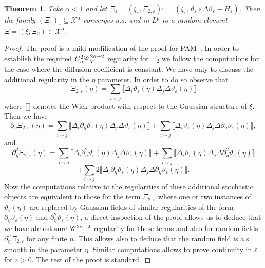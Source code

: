 \documentclass[11pt,reqno]{amsart}
\newtheorem{theorem}{Theorem}
\newcommand{\CC}{\mathscr{C} \hspace{.1em}}
\begin{document}
\begin{theorem}
  \label{th:conv-white-noise}Take $\alpha < 1$ and let $\Xi_{\varepsilon} =
  (\xi_{\varepsilon}, \Xi_{2, \varepsilon}) : = (\xi_{\varepsilon},
  \vartheta_{\varepsilon} \circ \Delta \vartheta_{\varepsilon} -
  H_{\varepsilon})$. Then the family $(\Xi_{\varepsilon})_{\varepsilon}
  \subseteq \mathcal{X}^{\alpha}$ converges a.s. and in $L^p$ to a random
  element $\Xi = (\xi, \Xi_2) \in \mathcal{X}^{\alpha}$.
\end{theorem}

\begin{proof}
  The proof is a mild modification of the proof for
  PAM~{\cite{gubinelli_paracontrolled_2015}}. In order to establish the
  required $C^2_{\eta} \CC^{2 \alpha - 2}_T$ regularity for $\Xi_2$ we follow
  the computations for the case where the diffusion coefficient is constant.
  We have only to discuss the additional regularity in the $\eta$ parameter.
  In order to do so observe that
  \[ \Xi_{2, \varepsilon} (\eta) = \sum_{i \sim j} \llbracket \Delta_i
     \vartheta_{\varepsilon} (\eta) \Delta_j \Delta \vartheta_{\varepsilon}
     (\eta) \rrbracket \]
  where $\llbracket \rrbracket$ denotes the Wick product with respect to the
  Gaussian structure of $\xi$. Then we have
  \[ \partial_{\eta} \Xi_{2, \varepsilon} (\eta) = \sum_{i \sim j} \llbracket
     \Delta_i \partial_{\eta} \vartheta_{\varepsilon} (\eta) \Delta_j \Delta
     \vartheta_{\varepsilon} (\eta) \rrbracket + \sum_{i \sim j} \llbracket
     \Delta_i \vartheta_{\varepsilon} (\eta) \Delta_j \Delta \partial_{\eta}
     \vartheta_{\varepsilon} (\eta) \rrbracket, \]
  and
  \[ \partial_{\eta}^2 \Xi_{2, \varepsilon} (\eta) = \sum_{i \sim j}
     \llbracket \Delta_i \partial_{\eta}^2 \vartheta_{\varepsilon} (\eta)
     \Delta_j \Delta \vartheta_{\varepsilon} (\eta) \rrbracket + \sum_{i \sim
     j} \llbracket \Delta_i \vartheta_{\varepsilon} (\eta) \Delta_j \Delta
     \partial_{\eta}^2 \vartheta_{\varepsilon} (\eta) \rrbracket \]
  \[ + \sum_{i \sim j} 2 \llbracket \Delta_i \partial_{\eta}
     \vartheta_{\varepsilon} (\eta) \Delta_j \Delta \partial_{\eta}
     \vartheta_{\varepsilon} (\eta) \rrbracket . \]
  Now the computations relative to the regularities of these additional
  stochastic objects are equivalent to those for the term $\Xi_{2,
  \varepsilon}$ where one or two instances of $\vartheta_{\varepsilon} (\eta)$
  are replaced by Gaussian fields of similar regularities of the form
  $\partial_{\eta} \vartheta_{\varepsilon} (\eta)$ and $\partial_{\eta}^2
  \vartheta_{\varepsilon} (\eta)$, a direct inspection of the proof allows us
  to deduce that we have almost sure $\CC^{2 \alpha - 2}$ regularity for these
  terms and also for random fields $\partial_{\eta}^n \Xi_{2, \varepsilon}$
  for any finite $n$. This allows also to deduce that the random field is a.s.
  smooth in the parameter $\eta$. Similar computations allows to prove
  continuity in $\varepsilon$ for $\varepsilon > 0$. The rest of the proof is
  standard.
\end{proof}
\end{document}
